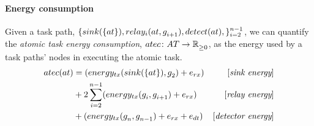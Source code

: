 \paragraph{Energy consumption}
\label{section:energy_consumption}

Given a task path, $\lbrace \functionSinkRoleAtomic{}{}, \functionRelayRole{i}{}{i+1}, \functionDetectorRole{}{},  \rbrace_{i=2}^{n-1}$, 
we can quantify the \textit{atomic task energy consumption}, $\formalAtomicTaskEnergyConsumption{}{}$, as the energy used by a task paths' nodes in executing the atomic task. 
\begin{equation}
\begin{aligned}
	\functionAtomicTaskEnergyConsumptionSignature{}{} 
	&= (\functionTransmissionEnergySink{}{} + \varReceiverEnergy{}{}) & [\textit{sink energy}]\\
	& + 2 \sum_{i=2}^{n-1} (\functionTransmissionEnergyRelay{i}{i+1} + \varReceiverEnergy{}{} )
	 & [\textit{relay energy}]\\
	&+ (
		\functionTransmissionEnergyDetector{n}{n-1}
		+ \varReceiverEnergy{}{}
		+ \varSensorEnergy{}{}
		)& [\textit{detector energy}]
\end{aligned}
\end{equation}
